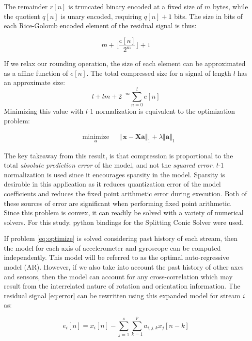 \documentclass[journal]{IEEEtran}
\begin{document}
The remainder $r[n]$ is truncated binary encoded at a fixed size of $m$ bytes, while the quotient $q[n]$ is unary encoded, requiring $q[n] + 1$ bits. The size in bits of each Rice-Golomb encoded element of the residual signal is thus:

$$ m + \lfloor\frac{e[n]}{2^m}\rfloor + 1$$

If we relax our rounding operation, the size of each element can be approximated as a affine function of $e[n]$. The total compressed size for a signal of length $l$ has an approximate size:
 $$l+lm+ 2^{-m}\sum_{n=0}^l e[n]$$
 Minimizing this value with $l$-1 normalization is equivalent to the optimization problem:
 
\begin{equation}
\begin{aligned}
& \underset{\mathbf{a}}{\text{minimize}}
& & \left\Vert \mathbf{x}-\mathbf{Xa} \right\Vert_1 + \lambda\left\Vert \mathbf{a} \right\Vert_1
\label{eq:optimize}
\end{aligned}
\end{equation}

The key takeaway from this result, is that compression is proportional to the total \textit{absolute prediction error} of the model, and not the \textit{squared error}. $l$-1 normalization is used since it encourages sparsity in the model. Sparsity is desirable in this application as it reduces quantization error of the model coefficients and reduces the fixed point arithmetic error during execution. Both of these sources of error are significant when performing fixed point arithmetic. Since this problem is convex, it can readily be solved with a variety of numerical solvers. For this study, python bindings for the Splitting Conic Solver were used\cite{ocpb:16}\cite{scs}\cite{cvxpy}.

If problem \eqref{eq:optimize} is solved considering past history of each stream, then the model for each axis of accelerometer and gyroscope can be computed independently. This model will be referred to as the optimal auto-regressive model (AR). However, if we also take into account the past history of other axes and sensors, then the model can account for any cross-correlation which may result from the interrelated nature of rotation and orientation information. The residual signal \eqref{eq:error} can be rewritten using this expanded model for stream $i$ as:

\begin{equation*}
e_i[n] = x_i[n] - \sum_{j=1}^{s}\sum_{k=1}^{p}a_{i,j,k}x_j[n-k]
\end{equation*}
\end{document}
